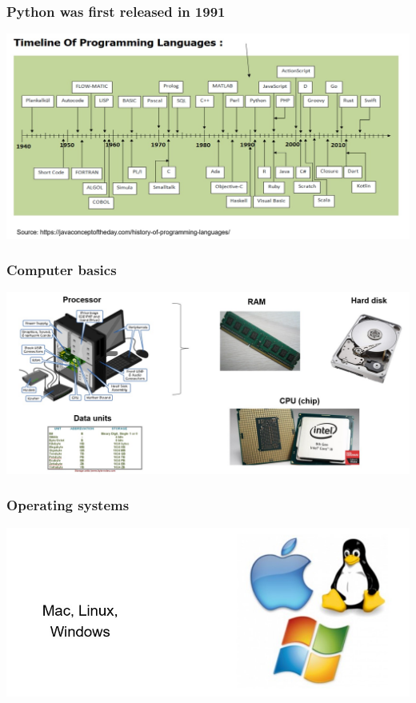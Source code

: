 \documentclass{beamer}
\begin{document}
\begin{frame}
    \frametitle{Python was first released in 1991}
    \centering
    \includegraphics[scale = 0.4]{figures/timeline_lang.jpg}
\end{frame}

\begin{frame}
    \frametitle{Computer basics}
    \centering
    \includegraphics[scale = 0.35]{figures/computer.jpg}
\end{frame}

\begin{frame}
    \frametitle{Operating systems}
    \centering
    \includegraphics[scale = 0.5]{figures/os.jpg}
\end{frame}
\end{document}
